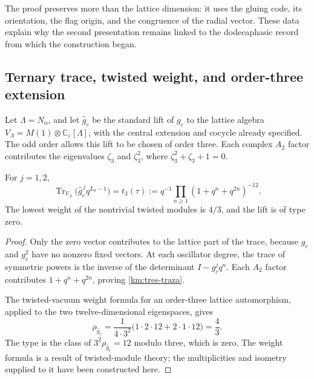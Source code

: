 The proof preserves more than the lattice dimension: it uses the
gluing code, its orientation, the flag origin, and the congruence of the
radial vector. These data explain why the second presentation
remains linked to the dodecaphasic record from which the construction began.

\subsection{Ternary trace, twisted weight, and order-three extension}
\label{km:orbifold-tres}

Let \(\Lambda=N_\alpha\), and let \(\widehat g_c\) be the standard
lift of \(g_c\) to the lattice algebra
\(V_\Lambda=M(1)\otimes\mathbb C_\varepsilon[\Lambda]\), with the
central extension and cocycle already specified. The odd order allows
this lift to be chosen of order three. Each complex \(A_2\) factor
contributes the eigenvalues \(\zeta_3\) and \(\zeta_3^2\), where
\(\zeta_3^2+\zeta_3+1=0\).

\begin{proposition}
\label{km:traza-tipo}
For \(j=1,2\),
\begin{equation}
 \operatorname{Tr}_{V_\Lambda}
       \bigl(\widehat g_c^{\,j}q^{L_0-1}\bigr)
 =t_3(\tau)
 :=q^{-1}\prod_{n\ge1}(1+q^n+q^{2n})^{-12}.
 \label{km:tres-traza}
\end{equation}
The lowest weight of the nontrivial twisted modules is \(4/3\), and
the lift is of type zero.
\end{proposition}
\begin{proof}
Only the zero vector contributes to the lattice part of the trace,
because \(g_c\) and \(g_c^2\) have no nonzero fixed vectors.
At each oscillator degree, the trace of symmetric powers is the inverse
of the determinant \(I-g_c^jq^n\). Each \(A_2\) factor contributes
\(1+q^n+q^{2n}\), proving \eqref{km:tres-traza}.

The twisted-vacuum weight formula for an order-three lattice
automorphism, applied to the two twelve-dimensional eigenspaces, gives
\[
 \rho_{\widehat g_c}
 =\frac{1}{4\cdot3^2}
   \bigl(1\cdot2\cdot12+2\cdot1\cdot12\bigr)=\frac43.
\]
The type is the class of \(3^2\rho_{\widehat g_c}=12\) modulo
three, which is zero. The weight formula is a result of twisted-module
theory; the multiplicities and isometry supplied to it
have been constructed here.
\end{proof}

